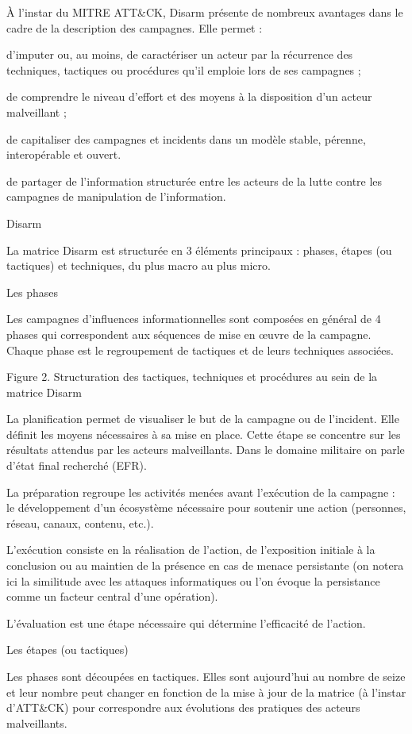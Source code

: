 À l’instar du MITRE ATT&CK, Disarm présente de nombreux avantages dans le cadre de la description des campagnes. Elle permet :

    d’imputer ou, au moins, de caractériser un acteur par la récurrence des techniques, tactiques ou procédures qu’il emploie lors de ses campagnes ;

    de comprendre le niveau d’effort et des moyens à la disposition d’un acteur malveillant ;

    de capitaliser des campagnes et incidents dans un modèle stable, pérenne, interopérable et ouvert.

    de partager de l’information structurée entre les acteurs de la lutte contre les campagnes de manipulation de l’information.

Disarm

La matrice Disarm est structurée en 3 éléments principaux : phases, étapes (ou tactiques) et techniques, du plus macro au plus micro. 

Les phases

Les campagnes d’influences informationnelles sont composées en général de 4 phases qui correspondent aux séquences de mise en œuvre de la campagne. Chaque phase est le regroupement de tactiques et de leurs techniques associées. 

Figure 2. Structuration des tactiques, techniques et procédures au sein de la matrice Disarm

    La planification permet de visualiser le but de la campagne ou de l’incident. Elle définit les moyens nécessaires à sa mise en place. Cette étape se concentre sur les résultats attendus par les acteurs malveillants. Dans le domaine militaire on parle d’état final recherché (EFR).

    La préparation regroupe les activités menées avant l'exécution de la campagne : le développement d’un écosystème nécessaire pour soutenir une action (personnes, réseau, canaux, contenu, etc.).

    L’exécution consiste en la réalisation de l’action, de l'exposition initiale à la conclusion ou au maintien de la présence en cas de menace persistante (on notera ici la similitude avec les attaques informatiques ou l’on évoque la persistance comme un facteur central d’une opération). 

    L’évaluation est une étape nécessaire qui détermine l’efficacité de l’action.

Les étapes (ou tactiques)

Les phases sont découpées en tactiques. Elles sont aujourd’hui au nombre de seize et leur nombre peut changer en fonction de la mise à jour de la matrice (à l’instar d’ATT&CK) pour correspondre aux évolutions des pratiques des acteurs malveillants.

